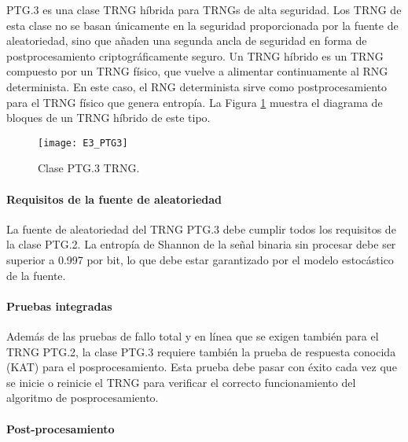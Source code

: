                 PTG.3 es una clase TRNG híbrida para TRNGs de alta seguridad. Los TRNG de esta clase no se basan únicamente en la seguridad proporcionada por la fuente de aleatoriedad, sino que añaden una segunda ancla de seguridad en forma de postprocesamiento criptográficamente seguro. Un TRNG híbrido es un TRNG compuesto por un TRNG físico, que vuelve a alimentar continuamente al RNG determinista. En este caso, el RNG determinista sirve como postprocesamiento para el TRNG físico que genera entropía. La Figura \ref{fig:E3_PTG3} muestra el diagrama de bloques de un TRNG híbrido de este tipo.

                \begin{figure}[hbtp]
                    \caption{Clase PTG.3 TRNG.}
                    \centering
                    \texttt{[image: E3\_PTG3]}
                    \label{fig:E3_PTG3}
                \end{figure}
            
                \paragraph{Requisitos de la fuente de aleatoriedad\\}
            
                La fuente de aleatoriedad del TRNG PTG.3 debe cumplir todos los requisitos de la clase PTG.2. La entropía de Shannon de la señal binaria sin procesar debe ser superior a 0.997 por bit, lo que debe estar garantizado por el modelo estocástico de la fuente.

                \paragraph{Pruebas integradas\\}
            
                Además de las pruebas de fallo total y en línea que se exigen también para el TRNG PTG.2, la clase PTG.3 requiere también la prueba de respuesta conocida (KAT) para el posprocesamiento. Esta prueba debe pasar con éxito cada vez que se inicie o reinicie el TRNG para verificar el correcto funcionamiento del algoritmo de posprocesamiento.
                
                \paragraph{Post-procesamiento\\}
            
